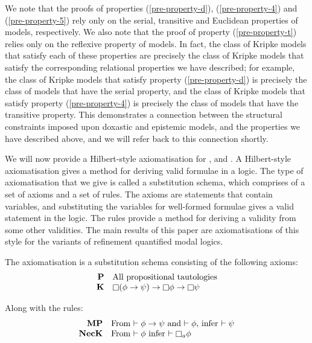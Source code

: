 We note that the proofs of properties (\ref{pre-property-d}),
(\ref{pre-property-4}) and (\ref{pre-property-5}) rely only on the serial,
transitive and Euclidean properties of \classKD{} models, respectively. We also
note that the proof of property (\ref{pre-property-t}) relies only on the
reflexive property of \classS{} models. In fact, the class of Kripke models that
satisfy each of these properties are precisely the class of Kripke models that
satisfy the corresponding relational properties we have described; for example,
the class of Kripke models that satisfy property (\ref{pre-property-d}) is
precisely the class of models that have the serial property, and the class of
Kripke models that satisfy property (\ref{pre-property-4}) is precisely the
class of models that have the transitive property. This demonstrates a
connection between the structural constraints imposed upon doxastic and
epistemic models, and the properties we have described above, and we will refer
back to this connection shortly.

We will now provide a Hilbert-style axiomatisation for \logicK{}, \logicKD{} and
\logicS{}. A Hilbert-style axiomatisation gives a method for deriving valid
formulae in a logic. The type of axiomatisation that we give is called a
substitution schema, which comprises of a set of axioms and a set of rules. The
axioms are statements that contain variables, and substituting the variables for
well-formed formulae gives a valid statement in the logic. The rules provide a
method for deriving a validity from some other validities. The main results of
this paper are axiomatisations of this style for the variants of refinement
quantified modal logics.
 
\begin{definition}\label{pre-axiom-k}
The axiomatisation \axiomK{} is a substitution schema consisting of the
following axioms:
$$
\begin{array}{rl}
{\bf P} & \text{All propositional tautologies}\\
{\bf K} & \knows (\phi \implies \psi) \implies \knows \phi \implies \knows
\psi\\
\end{array}
$$

Along with the rules:
$$
\begin{array}{rl}
{\bf MP} & \text{From $\proves \phi \implies \psi$ and $\proves \phi$, infer
$\proves \psi$}\\
{\bf NecK} & \text{From $\proves \phi$ infer $\proves \knows_a \phi$}\\
\end{array}
$$
\end{definition}

